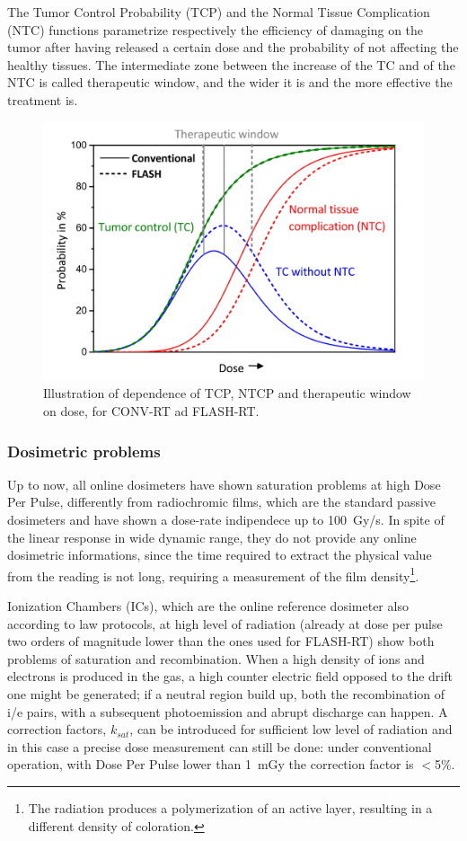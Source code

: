             The Tumor Control Probability (TCP) and the Normal Tissue Complication (NTC) functions parametrize respectively the efficiency of damaging on the tumor after having released a certain dose and the probability of not affecting the healthy tissues. The intermediate zone between the increase of the TC and of the NTC is called therapeutic window, and the wider it is and the more effective the treatment is. 
            \begin{figure}
                \centering
                \includegraphics[width=.7\linewidth]{figures/pixel_detectors_usage/curve_flash.png}
                \caption{Illustration of dependence of TCP, NTCP and therapeutic window on dose, for CONV-RT ad FLASH-RT.}
                \label{fig:therapeutic_window}
            \end{figure}

        \subsubsection{Dosimetric problems}
            Up to now, all online dosimeters have shown saturation problems at high Dose Per Pulse, differently from radiochromic films, which are the standard passive dosimeters and have shown a dose-rate indipendece up to \SI{100}{Gy/s}.
            In spite of the linear response in wide dynamic range, they do not provide any online dosimetric informations, since the time required to extract the physical value from the reading is not long, requiring a measurement of the film density\footnote{The radiation produces a polymerization of an active layer, resulting in a different density of coloration.}.

            Ionization Chambers (ICs), which are the online reference dosimeter also according to law protocols, at high level of radiation (already at dose per pulse two orders of magnitude lower than the ones used for FLASH-RT) show both problems of saturation and recombination. When a high density of ions and electrons is produced in the gas, a high counter electric field opposed to the drift one might be generated; if a neutral region build up, both the recombination of i/e pairs, with a subsequent photoemission and abrupt discharge can happen. A correction factors, $k_{sat}$, can be introduced for sufficient low level of radiation and in this case a precise dose measurement can still be done: under conventional operation, with Dose Per Pulse lower than \SI{1}{mGy} the correction factor is $<$5\%. 


